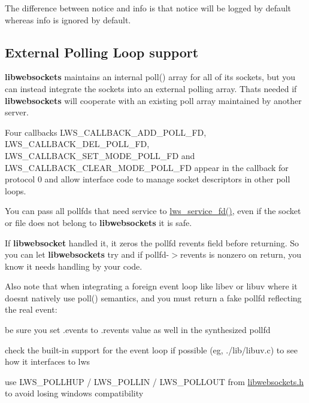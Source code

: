 The difference between notice and info is that notice will be logged by default whereas info is ignored by default.

\subsection*{External Polling Loop support }

{\bfseries libwebsockets} maintains an internal {\ttfamily poll()} array for all of its sockets, but you can instead integrate the sockets into an external polling array. That\textquotesingle{}s needed if {\bfseries libwebsockets} will cooperate with an existing poll array maintained by another server.

Four callbacks {\ttfamily L\+W\+S\+\_\+\+C\+A\+L\+L\+B\+A\+C\+K\+\_\+\+A\+D\+D\+\_\+\+P\+O\+L\+L\+\_\+\+FD}, {\ttfamily L\+W\+S\+\_\+\+C\+A\+L\+L\+B\+A\+C\+K\+\_\+\+D\+E\+L\+\_\+\+P\+O\+L\+L\+\_\+\+FD}, {\ttfamily L\+W\+S\+\_\+\+C\+A\+L\+L\+B\+A\+C\+K\+\_\+\+S\+E\+T\+\_\+\+M\+O\+D\+E\+\_\+\+P\+O\+L\+L\+\_\+\+FD} and {\ttfamily L\+W\+S\+\_\+\+C\+A\+L\+L\+B\+A\+C\+K\+\_\+\+C\+L\+E\+A\+R\+\_\+\+M\+O\+D\+E\+\_\+\+P\+O\+L\+L\+\_\+\+FD} appear in the callback for protocol 0 and allow interface code to manage socket descriptors in other poll loops.

You can pass all pollfds that need service to {\ttfamily \hyperlink{group__service_gad82efa5466d14a9f05aa06416375b28d}{lws\+\_\+service\+\_\+fd()}}, even if the socket or file does not belong to {\bfseries libwebsockets} it is safe.

If {\bfseries libwebsocket} handled it, it zeros the pollfd {\ttfamily revents} field before returning. So you can let {\bfseries libwebsockets} try and if {\ttfamily pollfd-\/$>$revents} is nonzero on return, you know it needs handling by your code.

Also note that when integrating a foreign event loop like libev or libuv where it doesn\textquotesingle{}t natively use poll() semantics, and you must return a fake pollfd reflecting the real event\+:


\begin{DoxyItemize}
\item be sure you set .events to .revents value as well in the synthesized pollfd
\item check the built-\/in support for the event loop if possible (eg, ./lib/libuv.c) to see how it interfaces to lws
\item use L\+W\+S\+\_\+\+P\+O\+L\+L\+H\+UP / L\+W\+S\+\_\+\+P\+O\+L\+L\+IN / L\+W\+S\+\_\+\+P\+O\+L\+L\+O\+UT from \hyperlink{libwebsockets_8h}{libwebsockets.\+h} to avoid losing windows compatibility
\end{DoxyItemize}

